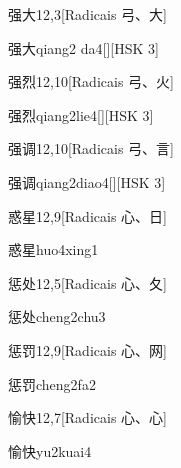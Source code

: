 \begin{entry}{强大}{12,3}[Radicais ⼸、⼤]
  \begin{phonetics}{强大}{qiang2 da4}[][HSK 3]
  \end{phonetics}
\end{entry}

\begin{entry}{强烈}{12,10}[Radicais ⼸、⽕]
  \begin{phonetics}{强烈}{qiang2lie4}[][HSK 3]
  \end{phonetics}
\end{entry}

\begin{entry}{强调}{12,10}[Radicais ⼸、⾔]
  \begin{phonetics}{强调}{qiang2diao4}[][HSK 3]
  \end{phonetics}
\end{entry}

\begin{entry}{惑星}{12,9}[Radicais ⼼、⽇]
  \begin{phonetics}{惑星}{huo4xing1}
  \end{phonetics}
\end{entry}

\begin{entry}{惩处}{12,5}[Radicais ⼼、⼡]
  \begin{phonetics}{惩处}{cheng2chu3}
  \end{phonetics}
\end{entry}

\begin{entry}{惩罚}{12,9}[Radicais ⼼、⽹]
  \begin{phonetics}{惩罚}{cheng2fa2}
  \end{phonetics}
\end{entry}

\begin{entry}{愉快}{12,7}[Radicais ⼼、⼼]
  \begin{phonetics}{愉快}{yu2kuai4}
  \end{phonetics}
\end{entry}


